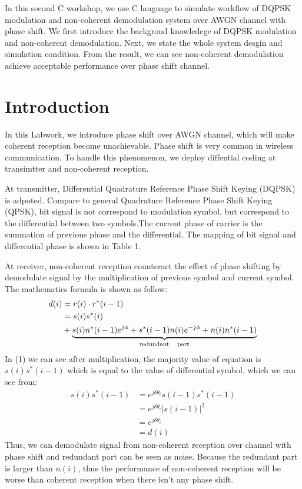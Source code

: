 \documentclass[technicalreport]{ieicej}
\begin{document}
\begin{eabstract}
In this second C workshop, we use C language to simulate workflow of DQPSK modulation and non-coherent demodulation system over AWGN channel with phase shift. We first introduce the backgroud knowledege of DQPSK modulation and non-coherent demodulation. Next, we state the whole system desgin and simulation condition. From the result, we can see non-coherent demodulation achieve acceptable performance over phase shift channel.
\end{eabstract}

\maketitle

\section{Introduction}
In this Labwork, we introduce phase shift over AWGN channel, which will make coherent reception become unachievable. Phase shift is very common in wireless communication. To handle this phenomenon, we deploy diffential coding at transimtter and non-coherent reception.\par
At transmitter, Differential Quadrature Reference Phase Shift Keying (DQPSK) is adpoted. Compare to general Quadrature Reference Phase Shift Keying (QPSK), bit signal is not correspond to modulation symbol, but correspond to the differential between two symbols.The current phase of carrier is the summation of previous phase and the differential. The mapping of bit signal and differential phase is shown in Table 1.\par
At receiver, non-coherent reception counteract the effect of phase shifting by demodulate signal by the multiplication of previous symbol and current symbol. The mathematics formula is shown as follow:
\begin{equation}
\begin{aligned}
d(i)&=r(i)\cdot r^*(i-1)\\
&=s(i)s^*(i)\\
&+\underbrace{s(i)n^*(i-1)e^{j\phi}+s^*(i-1)n(i)e^{-j\phi}+n(i)n^*(i-1)}_{\rm redundant\quad part}
\end{aligned}
\end{equation}
In (1) we can see after multiplication, the majority value of equation is $s(i)s^*(i-1)$ which is equal to the value of differential symbol, which we can see from:
\begin{equation}
\begin{aligned}
s(i)s^*(i-1)&=e^{j\delta\theta_i}s(i-1)s^*(i-1)\\
&=e^{j\delta\theta_i}|s(i-1)|^2\\
&=e^{j\delta\theta_i}\\
&=d(i)
\end{aligned}
\end{equation}
Thus, we can demodulate signal from non-coherent reception over channel with phase shift and redundant part can be seen as noise. Because the redundant part is larger than $n(i)$, thus the performance of non-coherent reception will be worse than coherent reception when there isn't any phase shift.
\end{document}
